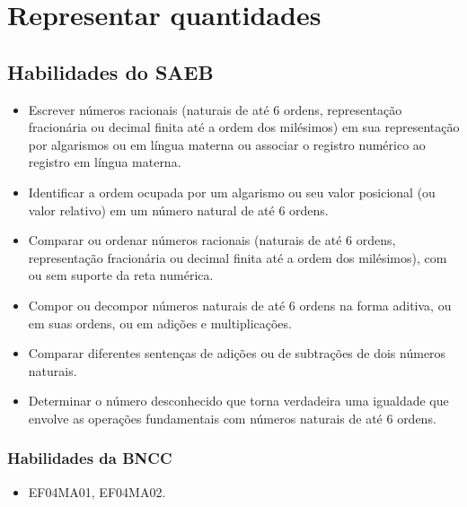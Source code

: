 \chapter{Representar quantidades}

\section*{Habilidades do SAEB}

\begin{itemize}
\item Escrever números racionais (naturais de até 6 ordens, representação
fracionária ou decimal finita até a ordem dos milésimos) em sua
representação por algarismos ou em língua materna ou associar o registro
numérico ao registro em língua materna.
\item Identificar a ordem ocupada por um algarismo ou seu valor posicional
(ou valor relativo) em um número natural de até 6 ordens.
\item Comparar ou ordenar números racionais (naturais de até 6 ordens,
representação fracionária ou decimal finita até a ordem dos milésimos),
com ou sem suporte da reta numérica.
\item Compor ou decompor números naturais de até 6 ordens na forma aditiva,
ou em suas ordens, ou em adições e multiplicações.
\item Comparar diferentes sentenças de adições ou de subtrações de dois
números naturais.
\item Determinar o número desconhecido que torna verdadeira uma igualdade
que envolve as operações fundamentais com números naturais de até 6
ordens.
\end{itemize}

\subsection{Habilidades da BNCC}

\begin{itemize}
\item EF04MA01, EF04MA02.
\end{itemize}

